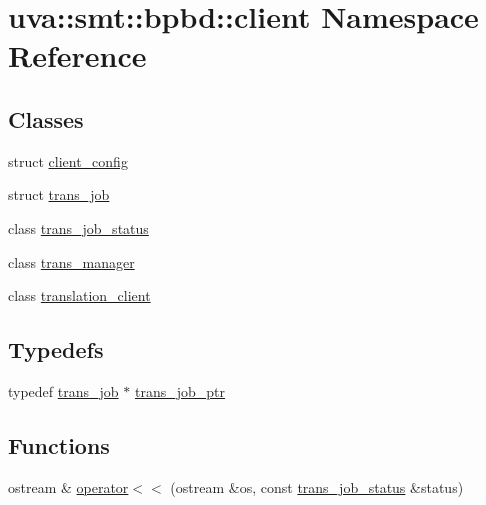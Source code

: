 \hypertarget{namespaceuva_1_1smt_1_1bpbd_1_1client}{}\section{uva\+:\+:smt\+:\+:bpbd\+:\+:client Namespace Reference}
\label{namespaceuva_1_1smt_1_1bpbd_1_1client}
\subsection*{Classes}
\begin{DoxyCompactItemize}
\item 
struct \hyperlink{structuva_1_1smt_1_1bpbd_1_1client_1_1client__config}{client\+\_\+config}
\item 
struct \hyperlink{structuva_1_1smt_1_1bpbd_1_1client_1_1trans__job}{trans\+\_\+job}
\item 
class \hyperlink{classuva_1_1smt_1_1bpbd_1_1client_1_1trans__job__status}{trans\+\_\+job\+\_\+status}
\item 
class \hyperlink{classuva_1_1smt_1_1bpbd_1_1client_1_1trans__manager}{trans\+\_\+manager}
\item 
class \hyperlink{classuva_1_1smt_1_1bpbd_1_1client_1_1translation__client}{translation\+\_\+client}
\end{DoxyCompactItemize}
\subsection*{Typedefs}
\begin{DoxyCompactItemize}
\item 
typedef \hyperlink{structuva_1_1smt_1_1bpbd_1_1client_1_1trans__job}{trans\+\_\+job} $\ast$ \hyperlink{namespaceuva_1_1smt_1_1bpbd_1_1client_a9de0122a1e3e5b28765f0b7b06449aa5}{trans\+\_\+job\+\_\+ptr}
\end{DoxyCompactItemize}
\subsection*{Functions}
\begin{DoxyCompactItemize}
\item 
ostream \& \hyperlink{namespaceuva_1_1smt_1_1bpbd_1_1client_ac53d6b03bbe2220c321c92c7428ec6ed}{operator$<$$<$} (ostream \&os, const \hyperlink{classuva_1_1smt_1_1bpbd_1_1client_1_1trans__job__status}{trans\+\_\+job\+\_\+status} \&status)
\end{DoxyCompactItemize}


